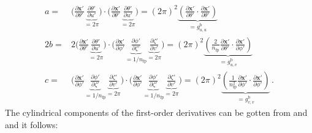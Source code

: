 \begin{align}
  a =&       \Biggl( \frac{\partial \mathbf{x}'}{\partial \theta'} \underbrace{\frac{\partial \theta'}{\partial u'}}_{=2\pi} \Biggr)
       \cdot \Biggl( \frac{\partial \mathbf{x}'}{\partial \theta'} \underbrace{\frac{\partial \theta'}{\partial u'}}_{=2\pi} \Biggr)
    =  (2 \pi)^2 \underbrace{\left( \frac{\partial \mathbf{x}'}{\partial \theta'} \cdot \frac{\partial \mathbf{x}'}{\partial \theta'} \right)}_{=g_{u,u}^\mathrm{b}} \\
 2b =& 2     \Biggl( \frac{\partial \mathbf{x}'}{\partial \theta'} \underbrace{\frac{\partial \theta'}{\partial u'}}_{=2\pi} \Biggr)
       \cdot \Biggl( \frac{\partial \mathbf{x}'}{\partial \phi'} \underbrace{\frac{\partial \phi'}{\partial \zeta'}}_{=1/n_\mathrm{fp}} \underbrace{\frac{\partial \zeta'}{\partial v'}}_{=2\pi} \Biggr)
    =  (2 \pi)^2 \underbrace{\left(\frac{2}{n_\mathrm{fp}} \frac{\partial \mathbf{x}'}{\partial \theta'} \cdot \frac{\partial \mathbf{x}'}{\partial \phi'} \right)}_{=g_{u,v}^\mathrm{b}} \\
  c =&       \Biggl( \frac{\partial \mathbf{x}'}{\partial \phi'} \underbrace{\frac{\partial \phi'}{\partial \zeta'}}_{=1/n_\mathrm{fp}} \underbrace{\frac{\partial \zeta'}{\partial v'}}_{=2\pi} \Biggr)
       \cdot \Biggl( \frac{\partial \mathbf{x}'}{\partial \phi'} \underbrace{\frac{\partial \phi'}{\partial \zeta'}}_{=1/n_\mathrm{fp}} \underbrace{\frac{\partial \zeta'}{\partial v'}}_{=2\pi} \Biggr)
    =  (2 \pi)^2 \underbrace{\left(\frac{1}{n_\mathrm{fp}^2} \frac{\partial \mathbf{x}'}{\partial \phi'} \cdot \frac{\partial \mathbf{x}'}{\partial \phi'} \right)}_{=g_{v,v}^\mathrm{b}} \, .
\end{align}
The cylindrical components of the first-order derivatives can be gotten from  and  and it follows:
